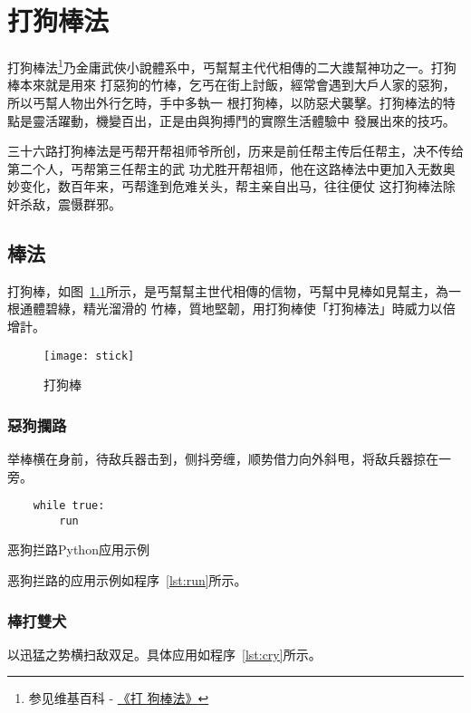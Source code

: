 \chapter{打狗棒法}
打狗棒法\footnote{参见维基百科 -
  \href{http://zh.wikipedia.org/wiki/\%E6\%89\%93\%E7\%8B\%97\%E6\%A3\%92\%E6\%B3\%95}{《打
    狗棒法》}}乃金庸武俠小說體系中，丐幫幫主代代相傳的二大謢幫神功之一。打狗棒本來就是用來
打惡狗的竹棒，乞丐在街上討飯，經常會遇到大戶人家的惡狗，所以丐幫人物出外行乞時，手中多執一
根打狗棒，以防惡犬襲擊。打狗棒法的特點是靈活躍動，機變百出，正是由與狗搏鬥的實際生活體驗中
發展出來的技巧。

三十六路打狗棒法是丐帮开帮祖师爷所创，历来是前任帮主传后任帮主，决不传给第二个人，丐帮第三任帮主的武
功尤胜开帮祖师，他在这路棒法中更加入无数奥妙变化，数百年来，丐帮逢到危难关头，帮主亲自出马，往往便仗
这打狗棒法除奸杀敌，震慑群邪\cite{dagoubang}。

\section{棒法}

打狗棒，如图~\ref{fig:stick}所示，是丐幫幫主世代相傳的信物，丐幫中見棒如見幫主，為一根通體碧綠，精光溜滑的
竹棒，質地堅韌，用打狗棒使「打狗棒法」時威力以倍增計。

\begin{figure}[H]
    \centerline{\texttt{[image: stick]}}
    \caption[打狗棒]{\label{fig:stick} 打狗棒}
\end{figure}

\subsection{惡狗攔路}

举棒横在身前，待敌兵器击到，侧抖旁缠，顺势借力向外斜甩，将敌兵器掠在一旁。
\begin{listing}[H]
  \begin{verbatim}
    while true:
        run
  \end{verbatim}
  \caption{恶狗拦路Python应用示例}
  \label{lst:run}
\end{listing}
恶狗拦路的应用示例如程序~\ref{lst:run}所示。

\subsection{棒打雙犬}
以迅猛之势横扫敌双足。具体应用如程序~\ref{lst:cry}所示。

